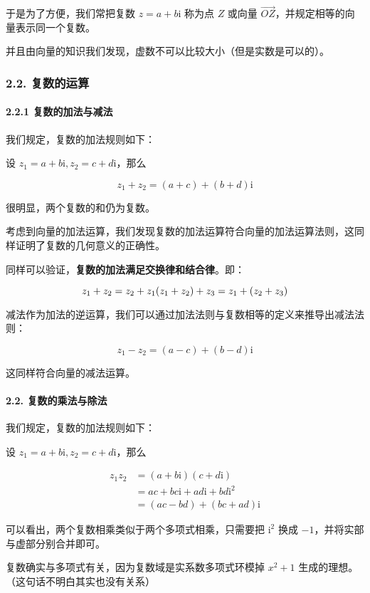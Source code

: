 于是为了方便，我们常把复数 $z=a+b\text{i}$ 称为点 $Z$ 或向量 $\overrightarrow {OZ}$，并规定相等的向量表示同一个复数。

并且由向量的知识我们发现，虚数不可以比较大小（但是实数是可以的）。

\subsubsection{2.2. 复数的运算}

\paragraph{2.2.1 复数的加法与减法}

我们规定，复数的加法规则如下：

设 $z_1=a+b\text{i},z_2=c+d\text{i}$，那么

$$
z_1+z_2=(a+c)+(b+d)\text{i}
$$

很明显，两个复数的和仍为复数。

考虑到向量的加法运算，我们发现复数的加法运算符合向量的加法运算法则，这同样证明了复数的几何意义的正确性。

同样可以验证，\textbf{复数的加法满足交换律和结合律}。即：

$$
z_1+z_2=z_2+z_1\\
(z_1+z_2)+z_3=z_1+(z_2+z_3)
$$

减法作为加法的逆运算，我们可以通过加法法则与复数相等的定义来推导出减法法则：

$$
z_1-z_2=(a-c)+(b-d)\text{i}
$$

这同样符合向量的减法运算。

\paragraph{2.2. 复数的乘法与除法}

我们规定，复数的加法规则如下：

设 $z_1=a+b\text{i},z_2=c+d\text{i}$，那么

$$
\begin{align}
z_1z_2&=(a+b\text{i})(c+d\text{i})\\
&=ac+bc\text{i}+ad\text{i}+bd\text{i}^2\\
&=(ac-bd)+(bc+ad)\text{i}
\end{align}
$$

可以看出，两个复数相乘类似于两个多项式相乘，只需要把 $\text{i}^2$ 换成 $-1$，并将实部与虚部分别合并即可。

复数确实与多项式有关，因为复数域是实系数多项式环模掉 $x^2+1$ 生成的理想。（这句话不明白其实也没有关系）

